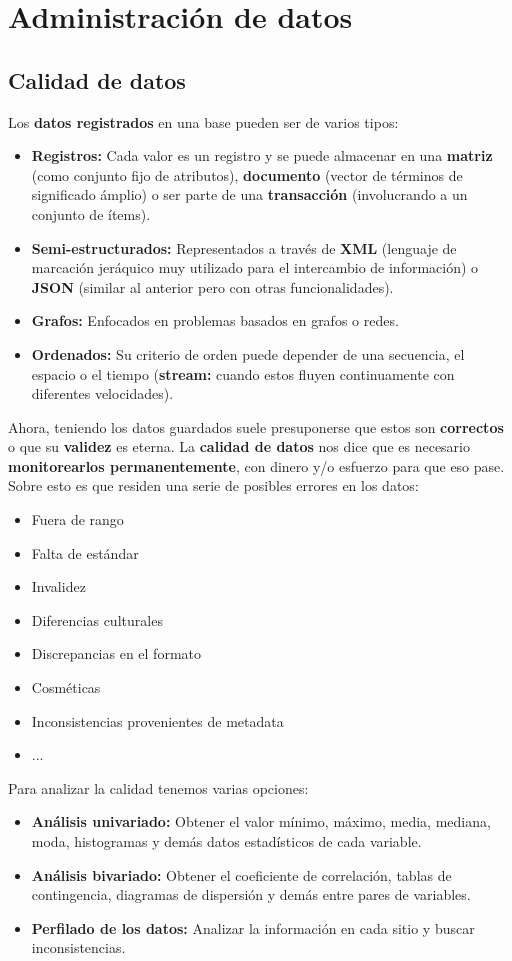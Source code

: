 \section*{Administración de datos}
\subsection*{Calidad de datos}
Los \textbf{datos registrados} en una base pueden ser de varios tipos:
\begin{itemize}
    \item \textbf{Registros:} Cada valor es un registro y se puede almacenar en una \textbf{matriz} (como conjunto fijo de atributos), \textbf{documento} (vector de términos de significado ámplio) o ser parte de una \textbf{transacción} (involucrando a un conjunto de ítems).
    \item \textbf{Semi-estructurados:} Representados a través de \textbf{XML} (lenguaje de marcación jeráquico muy utilizado para el intercambio de información) o \textbf{JSON} (similar al anterior pero con otras funcionalidades).
    \item \textbf{Grafos:} Enfocados en problemas basados en grafos o redes.
    \item \textbf{Ordenados:} Su criterio de orden puede depender de una secuencia, el espacio o el tiempo (\textbf{stream:} cuando estos fluyen continuamente con diferentes velocidades).
\end{itemize}
Ahora, teniendo los datos guardados suele presuponerse que estos son \textbf{correctos} o que su \textbf{validez} es eterna. La \textbf{calidad de datos} nos dice que es necesario \textbf{monitorearlos permanentemente}, con dinero y/o esfuerzo para que eso pase. Sobre esto es que residen una serie de posibles errores en los datos:
\begin{itemize}
    \item Fuera de rango
    \item Falta de estándar
    \item Invalidez
    \item Diferencias culturales
    \item Discrepancias en el formato
    \item Cosméticas
    \item Inconsistencias provenientes de metadata
    \item ...
\end{itemize}
Para analizar la calidad tenemos varias opciones:
\begin{itemize}
    \item \textbf{Análisis univariado:} Obtener el valor mínimo, máximo, media, mediana, moda, histogramas y demás datos estadísticos de cada variable.
    \item \textbf{Análisis bivariado:} Obtener el coeficiente de correlación, tablas de contingencia, diagramas de dispersión y demás entre pares de variables.
    \item \textbf{Perfilado de los datos:} Analizar la información en cada sitio y buscar inconsistencias.
\end{itemize}

